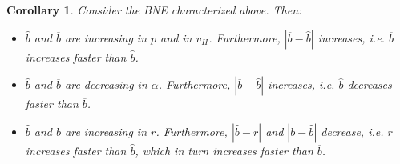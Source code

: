 \documentclass[11pt]{article}
\theoremstyle{plain}
\theoremstyle{definition}
\theoremstyle{plain}
\newtheorem{cor}[thm]{Corollary}
\theoremstyle{plain}
\theoremstyle{plain}
\theoremstyle{plain}
\numberwithin{equation}{section}
\begin{document}
\vspace{0.3cm}

\begin{cor}
Consider the BNE characterized above. Then:

\begin{itemize}
    \item[-] $ \hat{b} $ and $ \overline{b} $ are increasing in $ p $ and in $ v_H $. Furthermore, $ |\overline{b} - \hat{b}| $ increases, i.e. $ \overline{b} $ increases faster than $ \hat{b} $. 

    \vspace{0.2cm}

    \item[-] $ \hat{b} $ and $ \overline{b} $ are decreasing in $ \alpha $. Furthermore, $ |\overline{b} - \hat{b}| $ increases, i.e. $ \hat{b} $ decreases faster than $ \overline{b} $. 

    \vspace{0.2cm}

    \item[-] $ \hat{b} $ and $ \overline{b} $ are increasing in $ r $. Furthermore, $ |\hat{b} - r| $ and $ |\overline{b} - \hat{b}| $ decrease, i.e. $ r $ increases faster than $ \hat{b} $, which in turn increases faster than $ \overline{b} $.   
\end{itemize}

\end{cor}

\vspace{0.6cm}

\end{document}
